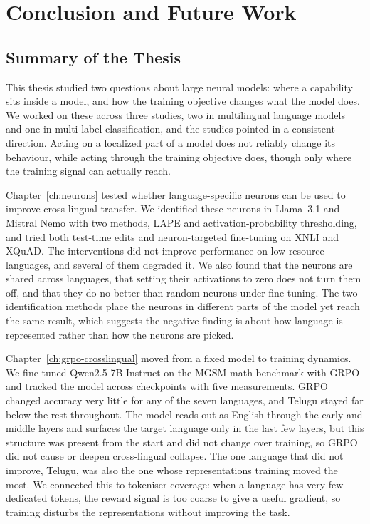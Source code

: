 \chapter{Conclusion and Future Work}
\label{ch:conclusion}

\section{Summary of the Thesis}
\label{sec:conclusion-summary}

This thesis studied two questions about large neural models: where a capability sits
inside a model, and how the training objective changes what the model does. We
worked on these across three studies, two in multilingual language models and one in
multi-label classification, and the studies pointed in a consistent direction.
Acting on a localized part of a model does not reliably change its behaviour, while
acting through the training objective does, though only where the training signal can
actually reach.

Chapter~\ref{ch:neurons} tested whether language-specific neurons can be used to
improve cross-lingual transfer. We identified these neurons in Llama~3.1 and Mistral
Nemo with two methods, LAPE and activation-probability thresholding, and tried both
test-time edits and neuron-targeted fine-tuning on XNLI and XQuAD. The interventions
did not improve performance on low-resource languages, and several of them degraded
it. We also found that the neurons are shared across languages, that setting their
activations to zero does not turn them off, and that they do no better than random
neurons under fine-tuning. The two identification methods place the neurons in
different parts of the model yet reach the same result, which suggests the negative
finding is about how language is represented rather than how the neurons are picked.

Chapter~\ref{ch:grpo-crosslingual} moved from a fixed model to training dynamics. We
fine-tuned Qwen2.5-7B-Instruct on the MGSM math benchmark with GRPO and tracked the
model across checkpoints with five measurements. GRPO changed accuracy very little
for any of the seven languages, and Telugu stayed far below the rest throughout. The
model reads out as English through the early and middle layers and surfaces the
target language only in the last few layers, but this structure was present from the
start and did not change over training, so GRPO did not cause or deepen cross-lingual
collapse. The one language that did not improve, Telugu, was also the one whose
representations training moved the most. We connected this to tokeniser coverage:
when a language has very few dedicated tokens, the reward signal is too coarse to
give a useful gradient, so training disturbs the representations without improving the
task.

